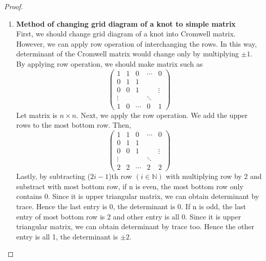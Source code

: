 \documentclass{article}
\theoremstyle{definition}
\begin{document}
\begin{proof}
\begin{enumerate}
    \item \textbf{Method of changing grid diagram of a knot to simple matrix}\\
    First, we should change grid diagram of a knot into Cromwell matrix. However, we can apply row operation of interchanging the rows. In this way, determinant of the Cromwell matrix would change only by multiplying $\pm 1$.\\
By applying row operation, we should make matrix such as
    $$\begin{pmatrix} 
    1 & 1 & 0 & \cdots & 0\\
    0 & 1 & 1 &  &  \\
    0 & 0 & 1 & & \vdots\\ 
    \vdots & & & \ddots & \\
    1 & 0 & \cdots & 0 & 1
    \end{pmatrix}$$
Let matrix is $n\times n$.
Next, we apply the row operation. We add the upper rows to the most bottom row. Then,
    $$\begin{pmatrix} 
    1 & 1 & 0 & \cdots & 0\\
    0 & 1 & 1 &  &  \\
    0 & 0 & 1 & & \vdots\\ 
    \vdots & & & \ddots & \\
    2 & 2 & \cdots & 2 & 2
    \end{pmatrix}$$
Lastly, by subtracting ($2i-1$)th row $(i \in \mathbb{N})$ with multiplying row by 2 and substract with most bottom row, if n is even, the most bottom row only contains 0. Since it is upper triangular matrix, we can obtain determinant by trace. Hence the last entry is 0, the determinant is 0. If n is odd, the last entry of most bottom row is 2 and other entry is all 0. Since it is upper triangular matrix, we can obtain determinant by trace too. Hence the other entry is all 1, the determinant is $\pm 2$.\\


\end{enumerate}
\end{proof}
\end{document}
